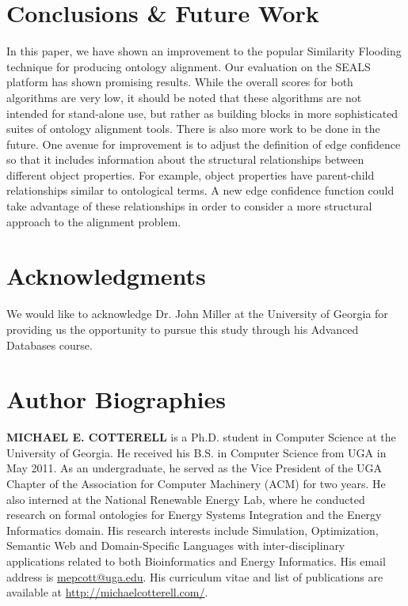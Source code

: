 \documentclass[letterpaper,twocolumn,12pt]{article}
\begin{document}
\section{Conclusions \& Future Work}
\label{sec:conclusions}
In this paper, we have shown an improvement to the popular
Similarity Flooding technique for producing ontology alignment.
Our evaluation on the SEALS platform has shown promising results. While the overall
scores for both algorithms are very low, it should be noted that these algorithms
are not intended for stand-alone use, but rather as building blocks in more
sophisticated suites of ontology alignment tools. There is also more work
to be done in the future.
One avenue for improvement is to adjust the definition of edge confidence so that it 
includes information about the structural relationships between different object properties.
For example, object properties have parent-child relationships similar to ontological terms.
A new edge confidence function could take advantage of these relationships in order to 
consider a more structural approach to the alignment problem.


\section*{Acknowledgments}

We would like to acknowledge Dr. John Miller at the University of Georgia for providing us the opportunity to pursue this study through his Advanced Databases course. 

%

 

\section*{Author Biographies} 
\vspace{8 pt}
\noindent \textbf{MICHAEL E. COTTERELL} is a Ph.D. student in Computer Science at the University of Georgia. 
He received his B.S. in Computer Science from UGA in May 2011. 
As an undergraduate, he served as the Vice President of the UGA Chapter of the Association for Computer Machinery (ACM) for two years. 
He also interned at the National Renewable Energy Lab, where he conducted research on formal ontologies for Energy Systems Integration and the Energy Informatics domain. 
His research interests include Simulation, Optimization, Semantic Web and Domain-Specific Languages with inter-disciplinary applications related to both Bioinformatics and Energy Informatics.
His email address is \href{mailto:mepcott@uga.edu}{mepcott@uga.edu}.
His curriculum vitae and list of publications are available at \url{http://michaelcotterell.com/}.
\end{document}
